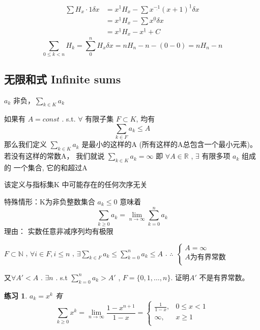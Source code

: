 \documentclass[mode=geye, chinesefont=founder]{elegantnote}
\newtheorem{exercise}{练习}
\newcommand{\fallingfactorial}[1]{%
  ^{\underline{#1}}%
}
\begin{document}
\begin{align*}
    \sum H_x\cdot 1 \delta x
    &= x\fallingfactorial{1}H_x - \sum x\fallingfactorial{-1}(x+1)\fallingfactorial{1} \delta x\\
    &= x\fallingfactorial{1}H_x - \sum x\fallingfactorial{0}\delta x\\
    &= x\fallingfactorial{1}H_x - x\fallingfactorial{1} + C
\end{align*}
\begin{equation*}
    \sum_{0\leqslant k<n}H_k = \sum_{0}^{n}H_x\delta x = n H_n - n - (0-0) = n H_n - n
\end{equation*}

\subsection{无限和式 Infinite sums}
$ a_k $ 非负，$ \sum_{k\in K} a_k$ 
\begin{definition}
    如果有 $ A= const $ . s.t. $ \forall $ 有限⼦集 $ F\subset K $, 均有
    \begin{equation*}
        \sum_{k\in F}a_k \leqslant A
    \end{equation*}
    那么我们定义 $ \sum_{k\in K} a_k$ 是最小的这样的A
    (所有这样的A总包含⼀个最小元素)。
    若没有这样的常数A，
    我们就说 $ \sum_{k\in K} a_k = \infty $
    即
    $ \forall A\in \mathbb{R} $ , $ \exists $ 
    有限多项 $ a_k $ 组成的
    ⼀个集合, 它的和超过A
\end{definition}
该定义与指标集K 中可能存在的任何次序⽆关

特殊情形：K为非负整数集合
$ a_k \leqslant 0 $ 意味着
\begin{equation*}
    \sum_{k\geqslant 0} a_k = \lim_{n\rightarrow \infty}\sum_{k=0}^{n}a_k
\end{equation*}
理由： 实数任意非减序列均有极限

$  F \subset \mathbb{N} $ , $ \forall i\in F, i\leqslant n $ , $ \exists \sum_{k\in F}a_k \leqslant \sum_{k=0}^{n}a_k \leqslant A $ . \;
 $ \therefore $  $  \left\{\begin{array}{l}
    A=\infty\\
    A\text{为有界常数}\\
\end{array}\right. $ 

又$ \forall A' < A$ . $ \exists n $ . s.t $ \sum_{k=0}^{n}a_k > A' $ , $ F = \{0,1,\dots,n\} $. 证明$ A' $ 不是有界常数。

\begin{exercise}
    $ a_k = x^k $ 有
    \begin{equation*}
        \sum_{k\geqslant 0}x^k = \lim_{n\rightarrow\infty}\frac{1-x^{n+1}}{1-x} = \left\{\begin{array}{ll}
            \frac{1}{1-x}, & 0\leqslant x<1 \\
            \infty, & x\geqslant 1 \\
        \end{array}\right.
    \end{equation*}
\end{exercise}
\end{document}

